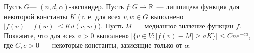 Пусть $G$--- $(n, d, \alpha)$-экспандер. Пусть $f: G \rightarrow \mathbb{R}$~--- липшицева функция для некоторой константы
$K$ (т. е. для всех $v, w \in G$ выполнено $|f(v) - f(w)| \le K d(v, w)$). Пусть $M$~--- медианное значение функции
$f$. Покажите, что для всех $a > 0$ выполнено $|\{v \in V: |f(v) - M| \ge a K \}| \le C n e^{-ca}$, где $C, c > 0$~---
некоторые константы, зависящие только от $\alpha$.